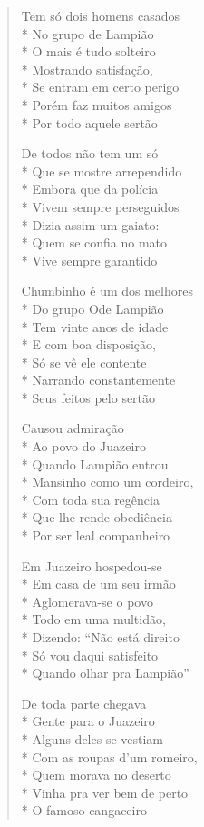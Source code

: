 \begin{verse}
Tem só dois homens casados\\*
No grupo de Lampião\\*
O mais é tudo solteiro\\*
Mostrando satisfação,\\*
Se entram em certo perigo\\*
Porém faz muitos amigos\\*
Por todo aquele sertão

De todos não tem um só\\*
Que se mostre arrependido\\*
Embora que da polícia\\*
Vivem sempre perseguidos\\*
Dizia assim um gaiato:\\*
Quem se confia no mato\\*
Vive sempre garantido

Chumbinho é um dos melhores\\*
Do grupo Ode Lampião\\*
Tem vinte anos de idade\\*
E com boa disposição,\\*
Só se vê ele contente\\*
Narrando constantemente\\*
Seus feitos pelo sertão

Causou admiração\\*
Ao povo do Juazeiro\\*
Quando Lampião entrou\\*
Mansinho como um cordeiro,\\*
Com toda sua regência\\*
Que lhe rende obediência\\*
Por ser leal companheiro

Em Juazeiro hospedou-se\\*
Em casa de um seu irmão\\*
Aglomerava-se o povo\\*
Todo em uma multidão,\\*
Dizendo: ``Não está direito\\*
Só vou daqui satisfeito\\*
Quando olhar pra Lampião''

De toda parte chegava\\*
Gente para o Juazeiro\\*
Alguns deles se vestiam\\*
Com as roupas d'um romeiro,\\*
Quem morava no deserto\\*
Vinha pra ver bem de perto\\*
O famoso cangaceiro


\end{verse}
